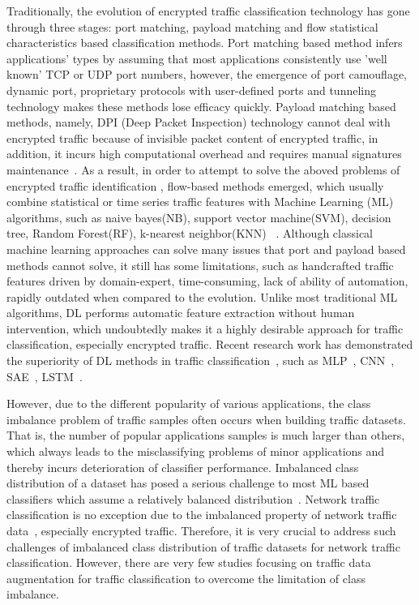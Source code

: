 \documentclass[conference]{IEEEtran}
\begin{document}
Traditionally, the evolution of encrypted traffic classification technology has gone through three stages: port matching, payload matching and flow statistical characteristics based classification methods. Port matching based method infers applications' types by assuming that most applications consistently use 'well known' TCP or UDP port numbers, however, the emergence of port camouflage, dynamic port, proprietary protocols with user-defined ports and tunneling technology makes these methods lose efficacy quickly. Payload matching based methods, namely, DPI (Deep Packet Inspection) technology cannot deal with encrypted traffic because of invisible packet content of encrypted traffic, in addition, it incurs high computational overhead and requires manual signatures maintenance~\cite{Finsterbusch2014,SDN-HGU,PhoneNumber}. As a result, in order to attempt to solve the aboved problems of encrypted traffic identification , flow-based methods emerged, which usually combine statistical or time series traffic features with Machine Learning (ML) algorithms,  such as naive bayes(NB), support vector machine(SVM), decision tree, Random Forest(RF), k-nearest neighbor(KNN) ~\cite{Pescape2008,Sun2010,Velan2015,Arndt2011}. Although classical machine learning approaches can solve many issues that port and payload based methods cannot solve, it still has some limitations, such as handcrafted traffic features driven by domain-expert, time-consuming, lack of ability of automation, rapidly outdated when compared to the evolution. Unlike most traditional ML algorithms, DL performs automatic feature extraction without human intervention, which undoubtedly makes it a highly desirable approach for traffic classification, especially encrypted traffic.  Recent research work has demonstrated the superiority of DL methods in traffic classification~\cite{MobileTC-2018}, such as MLP~\cite{Datanet}, CNN~\cite{deeppacket,Wang-1D-CNN,Wang2D-CNN,Seq2Img,HierarchicalTC}, SAE~\cite{blackhat}, LSTM~\cite{IoT-CNN-2017,HAST-IDS}. 





However, due to the different popularity of various applications, the class imbalance problem of traffic samples often occurs when building traffic datasets. That is, the number of popular applications samples is much larger than others, which always leads to the misclassifying problems of minor applications and thereby incurs deterioration of classifier performance. Imbalanced class distribution of a dataset has posed a serious challenge to most ML based classifiers which assume a relatively balanced distribution~\cite{Japkowicz:2002}. Network traffic classification is no exception due to the imbalanced property of network traffic data~\cite{Vu2017,Vu2016}, especially encrypted traffic. Therefore, it is very crucial to address such challenges of imbalanced class distribution of traffic datasets for network traffic classification. However, there are very few studies focusing on traffic data augmentation for traffic classification to overcome the limitation of class imbalance.
\end{document}
